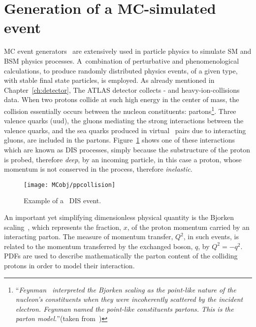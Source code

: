 	\section{Generation of a MC-simulated event}
	\label{sec:evGen}

		\ac{MC} event generators~\cite{Buckley:2011ms} are extensively used in particle physics to simulate \ac{SM} and \ac{BSM} physics processes. A combination of perturbative and phenomenological calculations, to produce randomly distributed physics events, of a given type, with stable final state particles, is employed. As already mentioned in Chapter~\ref{ch:detector}, The \ac{ATLAS} detector collects \pp- and heavy-ion-collisions data. When two protons collide at such high energy in the center of mass, the collision essentially occurs between the nucleon constituents: partons\footnote{``\emph{Feynman~\cite{PhysRevLett.23.1415} interpreted the Bjorken scaling as the point-like nature of the nucleon's constituents when they were incoherently scattered by the incident electron. Feynman named the point-like constituents partons. This is the parton model.}''(taken from~\cite{Yan:2014kna})}. Three valence quarks (uud), the gluons mediating the strong interactions between the valence quarks, and the sea quarks produced in virtual \qqbar\ pairs due to interacting gluons, are included in the partons. Figure~\ref{fig:DIS} shows one of these interactions which are known as \ac{DIS} processes, simply because the substructure of the proton is probed, therefore \emph{deep}, by an incoming particle, in this case a proton, whose momentum is not conserved in the process, therefore \emph{inelastic}.

		\begin{figure}[!htb]
			\centering
			\texttt{[image: MCobj/ppcollision]}
			\caption{\label{fig:DIS} Example of a \pp\ \ac{DIS} event.}
		\end{figure}

		An important yet simplifying dimensionless physical quantity is the Bjorken scaling~\cite{PhysRev.179.1547}, which represents the fraction, $x$, of the proton momentum carried by an interacting parton. The measure of momentum transfer, $Q^2$, in such events, is related to the momentum transferred by the exchanged boson, $q$, by $Q^2 = -q^2$. \ac{PDFs} are used to describe mathematically the parton content of the colliding protons in order to model their interaction.  

